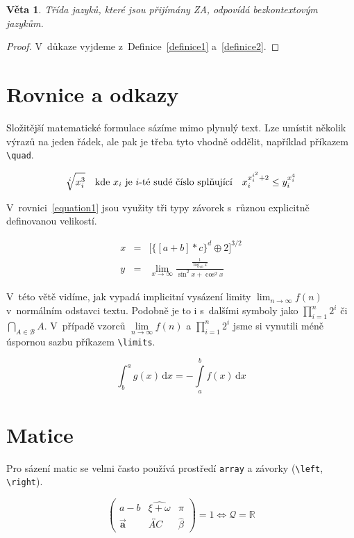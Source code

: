 \documentclass[a4paper, twocolumn, 11pt]{article}
\newtheorem{theorem}{Věta}
\begin{document}
\begin{theorem}
	Třída jazyků, které jsou přijímány ZA, odpovídá \emph{bezkontextovým jazykům.}
\end{theorem}

\begin{proof}
	V~důkaze vyjdeme z~Definice~\ref{definice1} a~\ref{definice2}.
\end{proof}

\section{Rovnice a odkazy}
Složitější matematické formulace sázíme mimo plynulý text.
Lze umístit několik výrazů na jeden řádek, ale pak je třeba tyto vhodně oddělit, například příkazem \verb|\quad|.

$$\sqrt[i]{x_i^3} \text{\quad}\text{kde } x_i \text{ je } i\text{-té sudé číslo splňující\quad} x_i^{x_i^{i^2} + 2} \leq y_i^{x_i^4}$$

V~rovnici~\eqref{equation1} jsou využity tři typy závorek s~různou explicitně definovanou velikostí.

\begin{eqnarray}
	x & = & \bigg[ \Big\{ \left[ a + b \right] * c \Big\} ^d \oplus 2 \bigg]^{3/2}\label{equation1}\\
	y & = &\lim_{x \rightarrow \infty} \frac{\frac{1}{\log_{10} x }}{\sin^2 x + \cos^2 x} \nonumber
\end{eqnarray}

V~této větě vidíme, jak vypadá implicitní vysázení limity $\lim_{n\rightarrow\infty} f(n)$ v~normálním odstavci textu.
Podobně je to i s~dalšími symboly jako $\prod^n_{i=1} 2^i$ či $\bigcap_{A\in \mathcal{B}} A$.
V~případě vzorců $\lim\limits_{n \rightarrow \infty} f(n)$ a $\prod\limits^n_{i=1} 2^i$ jsme si vynutili méně úspornou sazbu příkazem \verb|\limits|.

\begin{equation}
	\int_b^a g(x)\, \mathrm{d}x = -\int\limits_a^b f(x)\, \mathrm{d}x
\end{equation}

\section{Matice}
Pro sázení matic se velmi často používá prostředí \verb|array| a závorky (\verb|\left|, \verb|\right|).

$$ \left (
	\begin{array}{ccc}
			a - b            & \widehat{\xi+\omega}    & \pi         \\
			\vec{\mathbf{a}} & \overleftrightarrow{AC} & \hat{\beta}
		\end{array}
	\right) = 1 \Longleftrightarrow \mathcal{Q} = \mathbb{R}$$
\end{document}
